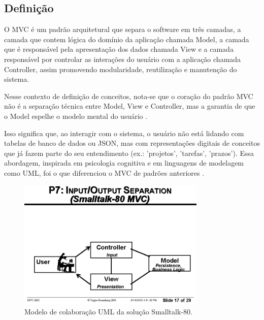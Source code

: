     \subsection{Definição}
        \par O MVC é um padrão arquitetural que separa o software em três camadas, a camada que contem lógica do domínio da aplicação chamada Model, a camada que é responsável pela apresentação dos dados chamada View e a camada responsável por controlar as interações do usuário com a aplicação chamada Controller, assim promovendo modularidade, reutilização e manutenção do sistema\cite{artigo:reenskaug:2003}.

        \par Nesse contexto de definição de conceitos, nota-se que o coração do padrão MVC não é a separação técnica entre Model, View e Controller, mas a garantia de que o Model espelhe o modelo mental do usuário \cite{artigo:reenskaug:2003}. 
        
        \par Isso significa que, ao interagir com o sistema, o usuário não está lidando com tabelas de banco de dados ou JSON, mas com representações digitais de conceitos que já fazem parte do seu entendimento (ex.: 'projetos', 'tarefas', 'prazos'). Essa abordagem, inspirada em psicologia cognitiva e em linguagens de modelagem como UML, foi o que diferenciou o MVC de padrões anteriores \cite{artigo:reenskaug:2003}.

        \begin{figure}[H] %
            \centering
            \includegraphics[width=0.8\textwidth]{figuras/figura_mvc_1.png}
            \caption{Modelo de colaboração UML da solução Smalltalk-80.}
            \label{fig:figura_mvc_1}
            \newcommand{\source}{Fonte: \cite{artigo:reenskaug:2003}}
        \end{figure}

